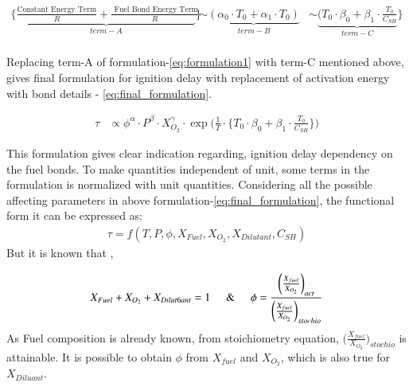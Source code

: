 \documentclass[preprint,12pt]{elsarticle}
\begin{document}
			\begin{equation}\label{eq:formularion_comparision_Ea}
			\begin{aligned}		
			\bigg\{\underbrace{\frac{\text{Constant Energy Term}}{R} + \frac{\text{ Fuel Bond Energy Term}}{R} }_{term-A}\bigg\} &\sim \underbrace{(\alpha_0 \cdot T_0 + \alpha_1 \cdot T_0 )}_{term-B} &\sim \underbrace{(T_0 \cdot \beta_0 + \beta_1 \cdot \frac{T_0}{C_{SH}}}_{term-C}\bigg\}\\
			\end{aligned}
			\end{equation}
			
			Replacing term-A of formulation-\ref{eq:formulation1} with term-C mentioned above, gives final formulation for ignition delay with replacement of activation energy with bond details - \ref{eq:final_formulation}.
			
			\begin{equation}\label{eq:final_formulation}
			\begin{aligned}		
			\tau &\propto  \phi^\alpha \cdot P^\beta  \cdot X_{O_2}^\gamma   \cdot \exp \bigg( \frac{1}{T} \cdot \bigg\{ T_0 \cdot \beta_0 + \beta_1 \cdot \frac{T_0}{C_{SH}}\bigg\} \bigg)	
			\end{aligned}
			\end{equation}
			
		
	 This formulation gives clear indication regarding, ignition delay dependency on the fuel bonds. To make quantities independent of unit, some terms in the formulation is normalized with unit quantities. Considering all the possible affecting parameters in above formulation-\ref{eq:final_formulation}, the functional form it can be expressed as:	
		  \begin{equation}\label{eq:functional}
		  \begin{aligned}
\tau = f(T,P,\phi,X_{Fuel},X_{O_2},X_{Dilutant},C_{SH})
		  \end{aligned}
		  \end{equation}
		 \hspace{0.25cm}But it is known that ,
		 
		 \begin{equation}
		 \begin{aligned}
			X_{Fuel}+X_{O_2}+X_{Dilut6ant} = 1
			 \hspace{0.5cm} \& \hspace{0.5cm}
		 \phi = \frac{\bigg(\frac{X_{fuel}}{X_{O_2}}\bigg)_{act}}{\bigg(\frac{X_{fuel}}{X_{O_2}}\bigg)_{stochio}}
	 	\end{aligned}
	 	\end{equation}
	 	As Fuel composition is already known, from stoichiometry equation,  $\bigg(\frac{X_{fuel}}{X_{O_2}}\bigg)_{stochio}$ is attainable. It is possible to obtain $\phi$ from $X_{fuel}$ and $X_{O_2}$, which is also true for $X_{Diluant}$. 
	 	
\end{document}
